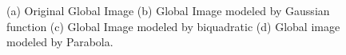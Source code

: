 \begin{figure}[t]
{\label{fig:subfig2} }  
\caption{(a)
Original Global Image (b) Global Image modeled by Gaussian function (c) Global
Image modeled by biquadratic (d) Global image modeled by Parabola.}
\label{fig:globcomp}
\end{figure}


